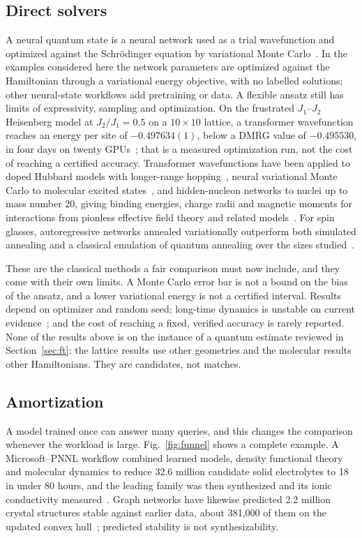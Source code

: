 \documentclass[10pt,a4paper]{article}
\begin{document}
\subsection{Direct solvers}
A neural quantum state is a neural network used as a trial wavefunction and optimized against the Schr\"odinger equation by variational Monte Carlo~\cite{carleo2017,carleo2019}. In the examples considered here the network parameters are optimized against the Hamiltonian through a variational energy objective, with no labelled solutions; other neural-state workflows add pretraining or data. A flexible ansatz still has limits of expressivity, sampling and optimization. On the frustrated $J_1$--$J_2$ Heisenberg model at $J_2/J_1=0.5$ on a $10\times10$ lattice, a transformer wavefunction reaches an energy per site of $-0.497634(1)$, below a DMRG value of $-0.495530$, in four days on twenty GPUs~\cite{rende2024}; that is a measured optimization run, not the cost of reaching a certified accuracy. Transformer wavefunctions have been applied to doped Hubbard models with longer-range hopping~\cite{gu2026}, neural variational Monte Carlo to molecular excited states~\cite{pfau2024,schatzle2026}, and hidden-nucleon networks to nuclei up to mass number 20, giving binding energies, charge radii and magnetic moments for interactions from pionless effective field theory and related models~\cite{lovato2022,gnech2024,lovato2026}. For spin glasses, autoregressive networks annealed variationally outperform both simulated annealing and a classical emulation of quantum annealing over the sizes studied~\cite{hibat2021,hibat2021b}.

These are the classical methods a fair comparison must now include, and they come with their own limits. A Monte Carlo error bar is not a bound on the bias of the ansatz, and a lower variational energy is not a certified interval. Results depend on optimizer and random seed; long-time dynamics is unstable on current evidence~\cite{tindall2025}; and the cost of reaching a fixed, verified accuracy is rarely reported. None of the results above is on the instance of a quantum estimate reviewed in Section~\ref{sec:ft}: the lattice results use other geometries and the molecular results other Hamiltonians. They are candidates, not matches.

\subsection{Amortization}
A model trained once can answer many queries, and this changes the comparison whenever the workload is large. Fig.~\ref{fig:funnel} shows a complete example. A Microsoft--PNNL workflow combined learned models, density functional theory and molecular dynamics to reduce 32.6 million candidate solid electrolytes to 18 in under 80 hours, and the leading family was then synthesized and its ionic conductivity measured~\cite{chen2024}. Graph networks have likewise predicted 2.2 million crystal structures stable against earlier data, about 381{,}000 of them on the updated convex hull~\cite{merchant2023}; predicted stability is not synthesizability.
\end{document}
